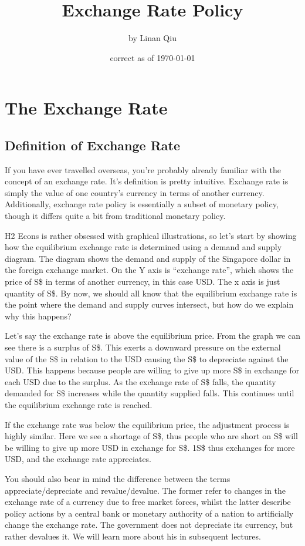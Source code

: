 \documentclass[DIV=calc,11pt,parskip,numbers=noenddot]{scrartcl} %
\title{Exchange Rate Policy}
\author{\large by Linan Qiu}
\date{\small correct as of \today}
\begin{document}
\maketitle
\tableofcontents
\section{The Exchange Rate}
\subsection{Definition of Exchange Rate}
If you have ever travelled overseas, you’re probably already familiar with the concept of an exchange rate. It’s definition is pretty intuitive. Exchange rate is simply the value of one country’s currency in terms of another currency. Additionally, exchange rate policy is essentially a subset of monetary policy, though it differs quite a bit from traditional monetary policy.

H2 Econs is rather obsessed with graphical illustrations, so let’s start by showing how the equilibrium exchange rate is determined using a demand and supply diagram. The diagram shows the demand and supply of the Singapore dollar in the foreign exchange market. On the Y axis is “exchange rate”, which shows the price of S\$ in terms of another currency, in this case USD. The x axis is just quantity of S\$. By now, we should all know that the equilibrium exchange rate is the point where the demand and supply curves intersect, but how do we explain why this happens?

Let’s say the exchange rate is above the equilibrium price. From the graph we can see there is a surplus of S\$. This exerts a downward pressure on the external value of the S\$ in relation to the USD causing the S\$ to depreciate against the USD. This happens because people are willing to give up more S\$ in exchange for each USD due to the surplus. As the exchange rate of S\$ falls, the quantity demanded for S\$ increases while the quantity supplied falls. This continues until the equilibrium exchange rate is reached.

If the exchange rate was below the equilibrium price, the adjustment process is highly similar. Here we see a shortage of S\$, thus people who are short on S\$ will be willing to give up more USD in exchange for S\$. 1S\$ thus exchanges for more USD, and the exchange rate appreciates.

You should also bear in mind the difference between the terms appreciate/depreciate and revalue/devalue. The former refer to changes in the exchange rate of a currency due to free market forces, whilst the latter describe policy actions by a central bank or monetary authority of a nation to artificially change the exchange rate. The government does not depreciate its currency, but rather devalues it. We will learn more about his in subsequent lectures.
\end{document}
